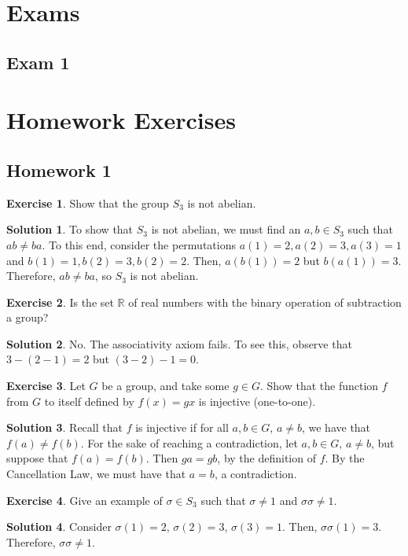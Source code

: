 \documentclass[12pt]{article}
\theoremstyle{definition}
\newtheorem{exercise}{\color{YellowOrange}Exercise}
\theoremstyle{definition}
\newtheorem{solution}{\color{Goldenrod}Solution}
\begin{document}
\section{Exams}
\subsection{Exam 1}

\section{Homework Exercises}
\subsection{Homework 1}
\begin{exercise}
Show that the group $S_3$ is not abelian. 
\end{exercise}
\begin{solution}
To show that $S_3$ is not abelian, we must find an $a,b \in S_3$ such that $ab \neq ba$. To this end, consider the permutations $a(1) = 2, a(2) = 3, a(3) = 1$ and $b(1) = 1, b(2) = 3, b(2) = 2.$ Then, $a(b(1))= 2$ but $b(a(1)) = 3$. Therefore, $ab \neq ba$, so $S_3$ is not abelian.
\end{solution}

\begin{exercise}
Is the set $\mathbb{R}$ of real numbers with the binary operation of subtraction a group?
\end{exercise}
\begin{solution}
No. The associativity axiom fails. To see this, observe that $3 - (2 - 1) = 2$ but $(3 - 2) - 1 = 0$. 
\end{solution}

\begin{exercise}
Let $G$ be a group, and take some $g \in G$. Show that the function $f$ from $G$ to itself defined by $f(x)=gx$ is injective (one-to-one).
\end{exercise} 
\begin{solution}
Recall that $f$ is injective if for all $a, b \in G$, $a \neq b$, we have that $f(a) \neq f(b)$. For the sake of reaching a contradiction, let $a,b \in G$, $a \neq b$, but suppose that $f(a) = f(b)$. Then $ga = gb$, by the definition of $f$. By the Cancellation Law, we must have that $a = b$, a contradiction.
\end{solution}

\begin{exercise}
Give an example of $\sigma \in S_3$ such that $\sigma \neq 1$ and $\sigma \sigma \neq 1$.
\end{exercise}
\begin{solution}
Consider $\sigma(1) = 2$, $\sigma(2) = 3$, $\sigma(3) = 1$. Then, $\sigma \sigma(1)=3$. Therefore, $\sigma\sigma \neq 1$.
\end{solution}
\end{document}
